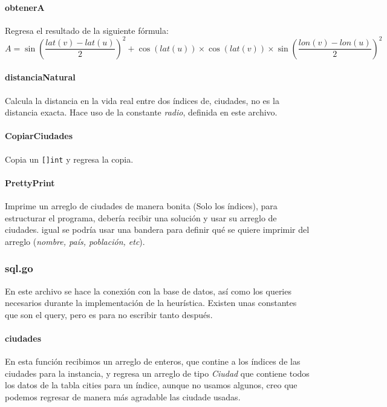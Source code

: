 \documentclass[
10pt,
a4paper,
oneside,
headinclude,footinclude,
BCOR5mm,
]{article}
\begin{document}
\paragraph{obtenerA} Regresa el resultado de la siguiente fórmula:
\begin{equation}
  A = \sin(\frac{lat(v)- lat(u)}{2})^{2} + \cos(lat(u)) \times \cos(lat(v)) \times
  \sin(\frac{lon(v) - lon(u)}{2})^{2}
\label{eq:refname2}
\end{equation}

\paragraph{distanciaNatural} Calcula la distancia en la vida real entre
dos índices de, ciudades, no es la distancia exacta. Hace uso de la constante
\textit{radio}, definida en este archivo.

\paragraph{CopiarCiudades} Copia un \texttt{[]int} y regresa la copia.

\paragraph{PrettyPrint} Imprime un arreglo de ciudades de manera bonita (Solo los
índices), para estructurar el programa, debería recibir una solución y usar su
arreglo de ciudades. igual se podría usar una bandera para definir qué se quiere
imprimir del arreglo (\textit{nombre, país, población, etc}).

\subsubsection{sql.go}
En este archivo se hace la conexión con la base de datos, así como los queries
necesarios durante la implementación de la heurística. Existen unas constantes
que son el query, pero es para no escribir tanto después.

\paragraph{ciudades} En esta función recibimos un arreglo de enteros, que contine
a los índices de las ciudades para la instancia, y regresa un arreglo de tipo
\textit{Ciudad} que contiene todos los datos de la tabla cities para un índice,
aunque no usamos algunos, creo que podemos regresar de manera más agradable las
ciudade usadas.
\end{document}
